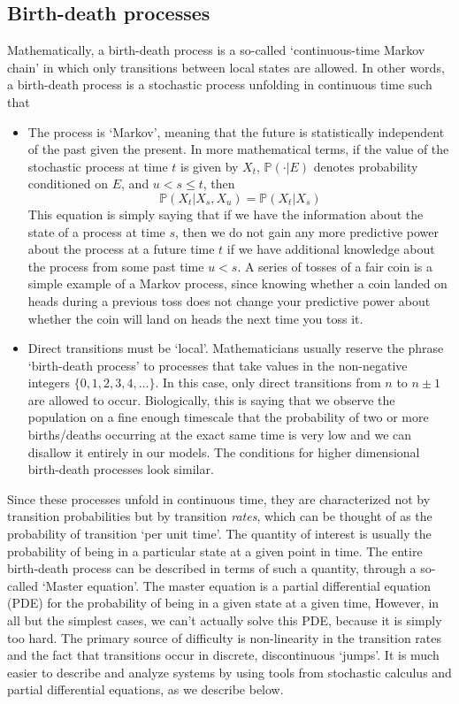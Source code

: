 \subsection{Birth-death processes}
Mathematically, a birth-death process is a so-called `continuous-time Markov chain' in which only transitions between local states are allowed. In other words, a birth-death process is a stochastic process unfolding in continuous time such that
\begin{itemize}
	\item The process is `Markov', meaning that the future is statistically independent of the past given the present. In more mathematical terms, if the value of the stochastic process at time $t$ is given by $X_t$, $\mathbb{P}(\cdot | E)$ denotes probability conditioned on $E$, and $u < s \leq t$, then
	\begin{equation*}
	\mathbb{P}(X_t | X_s, X_u) = \mathbb{P}(X_t | X_s)
	\end{equation*}
	This equation is simply saying that if we have the information about the state of a process at time $s$, then we do not gain any more predictive power about the process at a future time $t$ if we have additional knowledge about the process from some past time $u < s$. A series of tosses of a fair coin is a simple example of a Markov process, since knowing whether a coin landed on heads during a previous toss does not change your predictive power about whether the coin will land on heads the next time you toss it.
	\item Direct transitions must be `local'. Mathematicians usually reserve the phrase `birth-death process' to processes that take values in the non-negative integers $\{0,1,2,3,4,\ldots\}$. In this case, only direct transitions from $n$ to $n \pm 1$ are allowed to occur. Biologically, this is saying that we observe the population on a fine enough timescale that the probability of two or more births/deaths occurring at the exact same time is very low and we can disallow it entirely in our models. The conditions for higher dimensional birth-death processes look similar.
\end{itemize}
Since these processes unfold in continuous time, they are characterized not by transition probabilities but by transition \emph{rates}, which can be thought of as the probability of transition `per unit time'. The quantity of interest is usually the probability of being in a particular state at a given point in time. The entire birth-death process can be described in terms of such a quantity, through a so-called `Master equation'. The master equation is a partial differential equation (PDE) for the probability of being in a given state at a given time, However, in all but the simplest cases, we can't actually solve this PDE, because it is simply too hard. The primary source of difficulty is non-linearity in the transition rates and the fact that transitions occur in discrete, discontinuous `jumps'. It is much easier to describe and analyze systems by using tools from stochastic calculus and partial differential equations, as we describe below.

